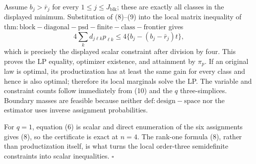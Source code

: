 Assume \(b_j>\bar r_j\) for every \(1\le j\le J_{\mathrm{blk}}\); these are exactly all classes in the displayed minimum.  Substitution of (8)--(9) into the local matrix inequality of \(\mathrm{thm:block-diagonal-psd-finite-class-frontier}\) gives
\[
4\sum_kd_{j\ell k}p_{\ell k}
\le4\{b_j-(b_j-\bar r_j)t\},
\tag{10}
\]
which is precisely the displayed scalar constraint after division by four.  This proves the LP equality, optimizer existence, and attainment by \(\pi_p\).  If an original law is optimal, its productization has at least the same gain for every class and hence is also optimal; therefore its local marginals solve the LP.  The variable and constraint counts follow immediately from (10) and the \(q\) three-simplices.  Boundary masses are feasible because neither \(\mathrm{def:design-space}\) nor the estimator uses inverse assignment probabilities.

For \(q=1\), equation (6) is scalar and direct enumeration of the six assignments gives (8), so the certificate is exact at \(n=4\).  The rank-one formula (8), rather than productization itself, is what turns the local order-three semidefinite constraints into scalar inequalities. \(\square\)